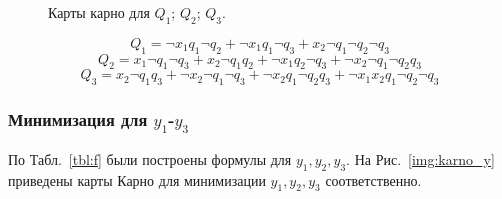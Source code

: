 \documentclass[a4paper, final]{article}
\begin{document}
\begin{figure}[H]
\centering {}  
  \hspace{4ex}
  \caption{Карты карно для  $Q_1$;  $Q_2$;
   $Q_3$.
  }
  \label{img:karno_q}
\end{figure}


\[Q_1 = \neg x_1 q_1 \neg q_2 + \neg x_1 q_1 \neg q_3 + x_2 \neg q_1 \neg q_2 \neg q_3\]
\[Q_2 = x_1 \neg q_1 \neg q_3 + x_2 \neg q_1 q_2 + \neg x_1 q_2 \neg q_3 + \neg x_2 \neg q_1 \neg q_2 q_3\]
\[Q_3 = x_2 \neg q_1 q_3 + \neg x_2 \neg q_1 \neg q_3 + \neg x_2 q_1 \neg q_2 q_3 + \neg x_1 x_2 q_1 \neg q_2 \neg q_3\]

\subsubsection{Минимизация для $y_1$-$y_3$}
По Табл.~\ref{tbl:f} были построены формулы для $y_1, y_2, y_3$. На Рис.~\ref{img:karno_y} приведены карты Карно для минимизации $y_1, y_2, y_3$ соответственно.
\end{document}
